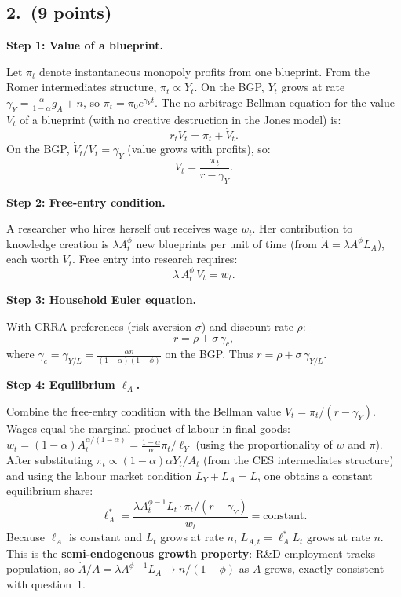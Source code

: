 \documentclass[a4paper,11pt]{article}
\begin{document}
\subsection*{2.\ (9 points)}

\begin{answerbox}
\textbf{Step 1: Value of a blueprint.}

Let $\pi_t$ denote instantaneous monopoly profits from one blueprint.  From the Romer intermediates structure, $\pi_t \propto Y_t$.  On the BGP, $Y_t$ grows at rate $\gamma_Y = \frac{\alpha}{1-\alpha}g_A + n$, so $\pi_t = \pi_0 e^{\gamma_Y t}$.  The no-arbitrage Bellman equation for the value $V_t$ of a blueprint (with no creative destruction in the Jones model) is:
\[
    r_t V_t = \pi_t + \dot{V}_t.
\]
On the BGP, $\dot{V}_t/V_t = \gamma_Y$ (value grows with profits), so:
\[
    V_t = \frac{\pi_t}{r - \gamma_Y}.
\]

\textbf{Step 2: Free-entry condition.}

A researcher who hires herself out receives wage $w_t$.  Her contribution to knowledge creation is $\lambda A_t^{\phi}$ new blueprints per unit of time (from $\dot{A} = \lambda A^{\phi} L_A$), each worth $V_t$.  Free entry into research requires:
\[
    \lambda\,A_t^{\phi}\,V_t = w_t.
\]

\textbf{Step 3: Household Euler equation.}

With CRRA preferences (risk aversion $\sigma$) and discount rate $\rho$:
\[
    r = \rho + \sigma\,\gamma_c,
\]
where $\gamma_c = \gamma_{Y/L} = \frac{\alpha n}{(1-\alpha)(1-\phi)}$ on the BGP.  Thus $r = \rho + \sigma\,\gamma_{Y/L}$.

\textbf{Step 4: Equilibrium $\ell_A$.}

Combine the free-entry condition with the Bellman value $V_t = \pi_t/(r-\gamma_Y)$.  Wages equal the marginal product of labour in final goods: $w_t = (1-\alpha)A_t^{\alpha/(1-\alpha)} = \frac{1-\alpha}{\alpha}\pi_t / \ell_Y$ (using the proportionality of $w$ and $\pi$).  After substituting $\pi_t \propto (1-\alpha)\alpha Y_t/A_t$ (from the CES intermediates structure) and using the labour market condition $L_Y + L_A = L$, one obtains a constant equilibrium share:
\[
    \ell_A^* = \frac{\lambda A_t^{\phi-1} L_t \cdot \pi_t / (r-\gamma_Y)}{w_t} = \text{constant}.
\]
Because $\ell_A$ is constant and $L_t$ grows at rate $n$, $L_{A,t} = \ell_A^* L_t$ grows at rate $n$.  This is the \textbf{semi-endogenous growth property}: R\&D employment tracks population, so $\dot{A}/A = \lambda A^{\phi-1} L_A \to n/(1-\phi)$ as $A$ grows, exactly consistent with question~1.
\end{answerbox}
\end{document}
